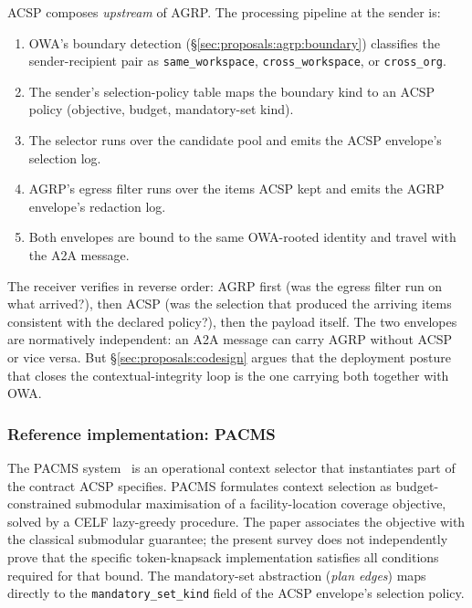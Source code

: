 ACSP composes \emph{upstream} of AGRP. The processing
pipeline at the sender is:

\begin{enumerate}
  \item OWA's boundary detection
    (\S\ref{sec:proposals:agrp:boundary}) classifies the
    sender-recipient pair as \texttt{same\_workspace},
    \texttt{cross\_workspace}, or \texttt{cross\_org}.
  \item The sender's selection-policy table maps the
    boundary kind to an ACSP policy (objective, budget,
    mandatory-set kind).
  \item The selector runs over the candidate pool and
    emits the ACSP envelope's selection log.
  \item AGRP's egress filter runs over the items ACSP
    kept and emits the AGRP envelope's redaction log.
  \item Both envelopes are bound to the same OWA-rooted
    identity and travel with the A2A message.
\end{enumerate}

The receiver verifies in reverse order: AGRP first (was
the egress filter run on what arrived?), then ACSP (was
the selection that produced the arriving items
consistent with the declared policy?), then the payload
itself. The two envelopes are normatively independent:
an A2A message can carry AGRP without ACSP or vice
versa. But \S\ref{sec:proposals:codesign} argues that
the deployment posture that closes the
contextual-integrity loop is the one carrying both
together with OWA.

\subsubsection{Reference implementation: PACMS}
\label{sec:proposals:acsp:pacms}

The PACMS system~\cite{pacms_cikm_demo} is an operational context
selector that instantiates part of the contract ACSP
specifies. PACMS formulates context selection as
budget-constrained submodular maximisation of a
facility-location coverage objective, solved by a CELF
lazy-greedy procedure. The paper associates the objective
with the classical submodular guarantee; the present survey
does not independently prove that the specific
token-knapsack implementation satisfies all conditions
required for that bound. The mandatory-set abstraction
(\emph{plan edges}) maps directly to the
\texttt{mandatory\_set\_kind} field of the ACSP envelope's
selection policy.

